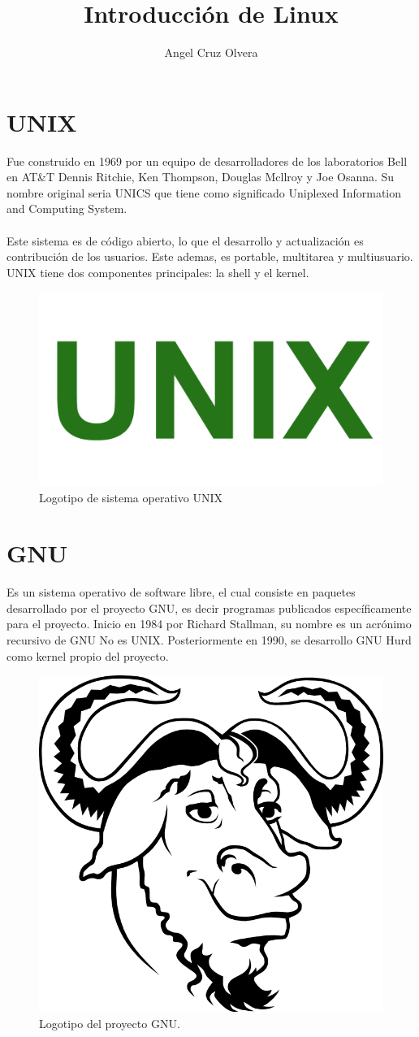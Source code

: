 \documentclass[10pt,a4paper,titlepage]{article}
\title{Introducción de Linux}
\author{Angel Cruz Olvera}
\begin{document}
	\maketitle
	
	\section*{UNIX}	
	Fue construido en 1969 por un equipo de desarrolladores de los laboratorios Bell en AT\&T Dennis Ritchie, Ken Thompson, Douglas Mcllroy y Joe Osanna. Su nombre original seria UNICS que tiene como significado Uniplexed Information and Computing System. 
	\\
	\\
	Este sistema es de código abierto, lo que el desarrollo y actualización es contribución de los usuarios. Este ademas, es portable, multitarea y multiusuario. UNIX tiene dos componentes principales: la shell y el kernel.
	
	\begin{figure}[H]
		\centering
		\includegraphics[width=0.5\linewidth]{"./images/unix.png"}
		\caption{Logotipo de sistema operativo UNIX}
		\label{fig:logo-UNIX}
	\end{figure}
	
	
	\section*{GNU}
	Es un sistema operativo de software libre, el cual consiste en paquetes desarrollado por el proyecto GNU, es decir programas publicados específicamente para el proyecto. Inicio en 1984 por Richard Stallman, su nombre es un acrónimo recursivo de GNU No es UNIX. Posteriormente en 1990, se desarrollo GNU Hurd como kernel propio del proyecto.
	
	\begin{figure}[H]
		\centering
		\includegraphics[width=0.5\linewidth]{"./images/gnu.png"}
		\caption{Logotipo del proyecto GNU.}
		\label{fig:logoGNU}
	\end{figure}
	
\end{document}
